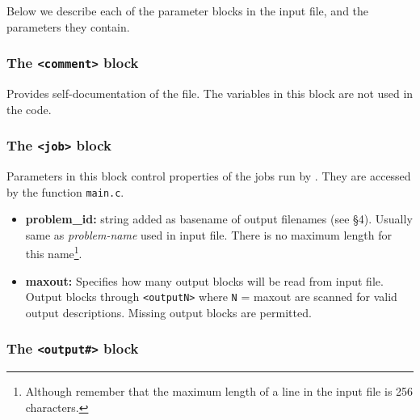 Below we describe each of the parameter blocks in the input file,
and the parameters they contain.

\subsubsection{The {\tt <comment>} block}

Provides self-documentation of the file.  The variables in this block
are not used in the code.

\subsubsection{The {\tt <job>} block}

Parameters in this block control properties of the jobs run by \ath.
They are accessed by the function {\tt main.c}.
\begin{itemize}

\item {\bf problem\_id:}
string added as basename of output filenames (see \S 4).  Usually same
as {\it problem-name} used in input file.  There is no maximum length
for this name\footnote{Although remember that the maximum length of a
line in the input file is 256 characters.}.

\item {\bf maxout:} Specifies how many output blocks will be read from
input file.  Output
blocks {\tt<output1>} through {\tt<outputN>} where {\tt N} = maxout
are scanned for valid output descriptions.  Missing output
blocks are permitted.

\end{itemize}

\subsubsection{The {\tt <output\#>} block}

